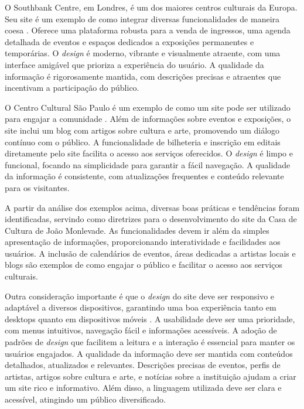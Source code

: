 O Southbank Centre, em Londres, é um dos maiores centros culturais da Europa. Seu site é um exemplo de como integrar diversas funcionalidades de maneira coesa \cite{southbank}. Oferece uma plataforma robusta para a venda de ingressos, uma agenda detalhada de eventos e espaços dedicados a exposições permanentes e temporárias. O \textit{design} é moderno, vibrante e visualmente atraente, com uma interface amigável que prioriza a experiência do usuário. A qualidade da informação é rigorosamente mantida, com descrições precisas e atraentes que incentivam a participação do público.

O Centro Cultural São Paulo é um exemplo de como um site pode ser utilizado para engajar a comunidade \cite{ccsp}. Além de informações sobre eventos e exposições, o site inclui um blog com artigos sobre cultura e arte, promovendo um diálogo contínuo com o público. A funcionalidade de bilheteria e inscrição em editais diretamente pelo site facilita o acesso aos serviços oferecidos. O \textit{design} é limpo e funcional, focando na simplicidade para garantir a fácil navegação. A qualidade da informação é consistente, com atualizações frequentes e conteúdo relevante para os visitantes.

A partir da análise dos exemplos acima, diversas boas práticas e tendências foram identificadas, servindo como diretrizes para o desenvolvimento do site da Casa de Cultura de João Monlevade. As funcionalidades devem ir além da simples apresentação de informações, proporcionando interatividade e facilidades aos usuários. A inclusão de calendários de eventos, áreas dedicadas a artistas locais e blogs são exemplos de como engajar o público e facilitar o acesso aos serviços culturais.

Outra consideração importante é que o \textit{design} do site deve ser responsivo e adaptável a diversos dispositivos, garantindo uma boa experiência tanto em desktops quanto em dispositivos móveis \cite{almeida2017role}. A usabilidade deve ser uma prioridade, com menus intuitivos, navegação fácil e informações acessíveis. A adoção de padrões de \textit{design} que facilitem a leitura e a interação é essencial para manter os usuários engajados. A qualidade da informação deve ser mantida com conteúdos detalhados, atualizados e relevantes. Descrições precisas de eventos, perfis de artistas, artigos sobre cultura e arte, e notícias sobre a instituição ajudam a criar um site rico e informativo. Além disso, a linguagem utilizada deve ser clara e acessível, atingindo um público diversificado.
